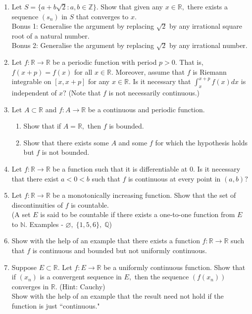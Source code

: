 \documentclass{article}
\let\emptyset\varnothing
\begin{document}
\begin{enumerate}
	\item Let $S = \{a + b\sqrt{2} : a, b \in \mathbb{Z}\}.$ Show that given any $x \in \mathbb{R},$ there exists a sequence $(s_n)$ in $S$ that converges to $x.$\\
	Bonus 1: Generalise the argument by replacing $\sqrt{2}$ by any irrational square root of a natural number.\\
	Bonus 2: Generalise the argument by replacing $\sqrt{2}$ by any irrational number.
	\item Let $f:\mathbb{R} \to \mathbb{R}$ be a periodic function with period $p > 0.$ That is, $f(x+p) = f(x)$ for all $x \in \mathbb{R}.$ Moreover, assume that $f$ is Riemann integrable on $[x, x+p]$ for any $x \in \mathbb{R}.$ Is it necessary that $\displaystyle\int_{x}^{x+p} f(x) dx $ is independent of $x?$ (Note that $f$ is not necessarily continuous.)
	\item Let $A \subset \mathbb{R}$ and $f:A\to\mathbb{R}$ be a continuous and periodic function.
	\begin{enumerate}[nosep] 
		\item Show that if $A = \mathbb{R},$ then $f$ is bounded.
		\item Show that there exists some $A$ and some $f$ for which the hypothesis holds but $f$ is not bounded.
	\end{enumerate}
	\item Let $f:\mathbb{R} \to \mathbb{R}$ be a function such that it is differentiable at $0.$ Is it necessary that there exist $a < 0 < b$ such that $f$ is continuous at every point in $(a, b)?$
	\item Let $f:\mathbb{R}\to\mathbb{R}$ be a monotonically increasing function. Show that the set of discontinuities of $f$ is countable.\\
	(A set $E$ is said to be countable if there exists a one-to-one function from $E$ to $\mathbb{N}.$ Examples - $\emptyset,\;\{1, 5, 6\},\;\mathbb{Q}$)
	\item Show with the help of an example that there exists a function $f:\mathbb{R} \to \mathbb{R}$ such that $f$ is continuous and bounded but not uniformly continuous.
	\item Suppose $E \subset \mathbb{R}.$ Let $f:E \to \mathbb{R}$ be a uniformly continuous function. Show that if $(x_n)$ is a convergent sequence in $E,$ then the sequence $(f(x_n))$ converges in $\mathbb{R}.$ \hfill (Hint: Cauchy)\\
	Show with the help of an example that the result need not hold if the function is just ``continuous."

\end{enumerate}
\end{document}
